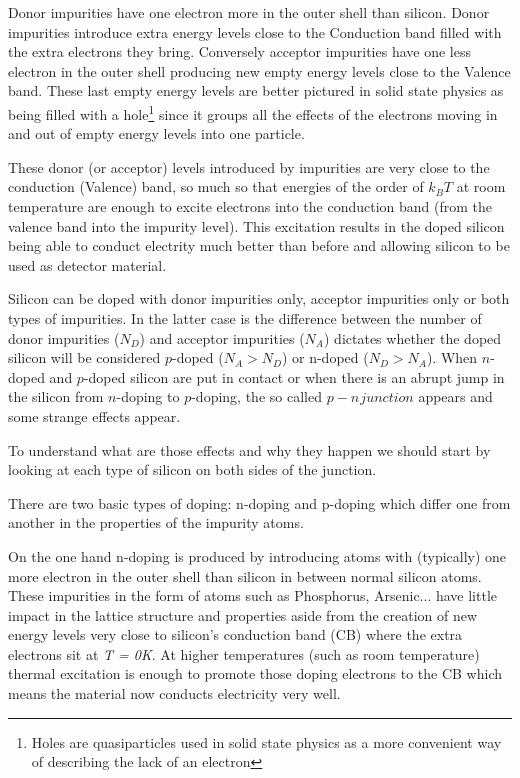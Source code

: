 Donor impurities have one electron more in the outer shell than silicon. Donor impurities introduce extra energy levels close to the Conduction band filled with the extra electrons they bring. Conversely acceptor impurities have one less electron in the outer shell producing new empty energy levels close to the Valence band. These last empty energy levels are better pictured in solid state physics as being filled with a hole\footnote{Holes are quasiparticles used in solid state physics as a more convenient way of describing the lack of an electron} since it groups all the effects of the electrons moving in and out of empty energy levels into one particle.

These donor (or acceptor) levels introduced by impurities are very close to the conduction (Valence) band, so much so that energies of the order of $k_B T$ at room temperature are enough to excite electrons into the conduction band (from the valence band into the impurity level). This excitation results in the doped silicon being able to conduct electrity much better than before and allowing silicon to be used as detector material.

Silicon can be doped with donor impurities only, acceptor impurities only or both types of impurities. In the latter case is the difference between the number of donor impurities ($N_D$) and acceptor impurities ($N_A$) dictates whether the doped silicon will be considered $p$-doped ($N_A > N_D $) or n-doped ($N_D > N_A$). When $n$-doped and $p$-doped silicon are put in contact or when there is an abrupt jump in the silicon from $n$-doping to $p$-doping, the so called $p-n \hspace{1pt} junction$ appears and some strange effects appear.

To understand what are those effects and why they happen we should start by looking at each type of silicon on both sides of the junction.



There are two basic types of doping: n-doping and p-doping which differ one from another in the properties of the impurity atoms.

On the one hand n-doping is produced by introducing atoms with (typically) one more electron in the outer shell than silicon in between normal silicon atoms. These impurities in the form of atoms such as Phosphorus, Arsenic... have little impact in the lattice structure and properties aside from the creation of new energy levels very close to silicon’s conduction band (CB) where the extra electrons sit at \textit{T = 0K}. At higher temperatures (such as room temperature) thermal excitation is enough to promote those doping electrons to the CB which means the material now conducts electricity very well.

